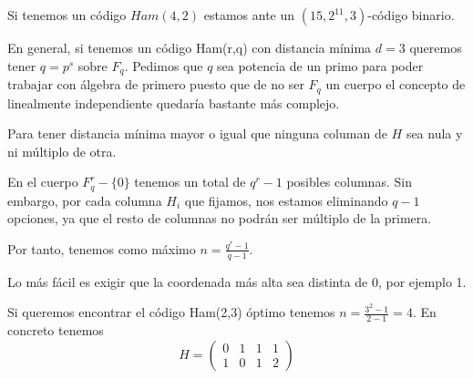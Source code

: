 Si tenemos un código $Ham(4,2)$ estamos ante un $(15,2^{11},3)$-código binario.

En general, si tenemos un código Ham(r,q) con distancia mínima $d=3$ queremos tener $q=p^s$ sobre $F_q$. Pedimos que $q$ sea potencia de un primo para poder trabajar con álgebra de primero puesto que de no ser $F_q$ un cuerpo el concepto de linealmente independiente quedaría bastante más complejo.

Para tener distancia mínima mayor o igual que ninguna columan de $H$ sea nula y ni múltiplo de otra.

En el cuerpo $F_q^r-\{0\}$ tenemos un total de $q^r-1$ posibles columnas. Sin embargo, por cada columna $H_i$ que fijamos, nos estamos eliminando $q-1$ opciones, ya que el resto de columnas no podrán ser múltiplo de la primera.

Por tanto, tenemos como máximo $n=\frac{q^r-1}{q-1}$.

Lo más fácil es exigir que la coordenada más alta sea distinta de 0, por ejemplo 1.

\begin{example}
Si queremos encontrar el código Ham(2,3) óptimo tenemos $n=\frac{3^2-1}{2-1}=4$. En concreto tenemos
\[H=\left( \begin{array}{cccc}
0 & 1 & 1 & 1 \\
1 & 0 & 1 & 2
\end{array}\right)\]
\end{example}